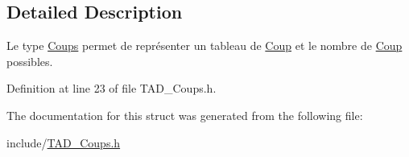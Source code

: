 \subsection{Detailed Description}
Le type \hyperlink{struct_coups}{Coups} permet de représenter un tableau de \hyperlink{struct_coup}{Coup} et le nombre de \hyperlink{struct_coup}{Coup} possibles. 

Definition at line 23 of file T\+A\+D\+\_\+\+Coups.\+h.



The documentation for this struct was generated from the following file\+:\begin{DoxyCompactItemize}
\item 
include/\hyperlink{_t_a_d___coups_8h}{T\+A\+D\+\_\+\+Coups.\+h}\end{DoxyCompactItemize}
